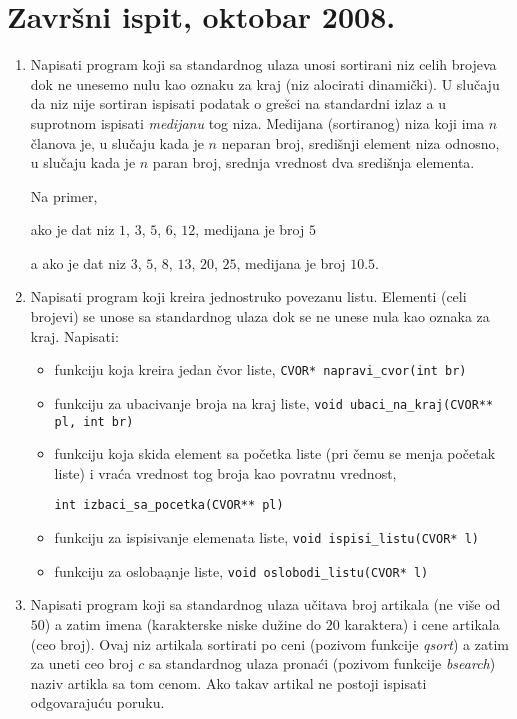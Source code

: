 \section{Zavr\v{s}ni ispit, oktobar 2008.}


\begin{enumerate}

\item

Napisati program koji sa standardnog ulaza unosi sortirani niz celih brojeva
dok ne unesemo nulu kao oznaku za kraj (niz alocirati dinami\v cki).
U slu\v caju da niz nije sortiran ispisati podatak o gre\v sci na standardni
izlaz a u suprotnom ispisati \emph{medijanu} tog niza.
Medijana (sortiranog) niza koji ima $n$
\v clanova je, u slu\v caju kada je $n$ neparan broj, sredi\v snji element
niza odnosno, u slu\v caju kada je $n$ paran broj, srednja vrednost dva
sredi\v snja elementa.

Na primer,

ako je dat niz $1$, $3$, $5$, $6$, $12$, medijana je broj $5$

a ako je dat niz $3$, $5$, $8$, $13$, $20$, $25$, medijana je broj $10.5$.

\item

Napisati program koji kreira jednostruko povezanu listu. Elementi (celi
brojevi) se unose sa standardnog ulaza dok se ne unese nula kao oznaka za
kraj. Napisati:
\begin{itemize}
\item funkciju koja kreira jedan \v cvor liste,
\verb+CVOR* napravi_cvor(int br)+
\item funkciju za ubacivanje broja na kraj liste,
\verb+void ubaci_na_kraj(CVOR** pl, int br)+
\item funkciju koja skida element sa po\v cetka liste (pri \v cemu se menja
po\v cetak liste) i vra\' ca vrednost tog broja kao povratnu vrednost,

\verb+int izbaci_sa_pocetka(CVOR** pl)+
\item funkciju za ispisivanje elemenata liste,
\verb+void ispisi_listu(CVOR* l)+
\item funkciju za osloba\d anje liste,
\verb+void oslobodi_listu(CVOR* l)+
\end{itemize}

\item

Napisati program koji sa standardnog ulaza u\v citava broj artikala (ne
vi\v se od $50$) a zatim imena (karakterske niske du\v zine do $20$
karaktera) i cene artikala (ceo broj). Ovaj niz artikala sortirati po ceni
(pozivom funkcije \emph{qsort}) a zatim za uneti ceo broj $c$ sa standardnog
ulaza prona\' ci (pozivom funkcije \emph{bsearch}) naziv artikla sa
tom cenom. Ako takav artikal ne postoji ispisati odgovaraju\' cu
poruku.
\end{enumerate}


